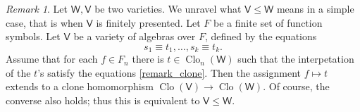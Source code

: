 \documentclass{amsart}
\theoremstyle{plain}
\theoremstyle{definition}
\theoremstyle{remark}
\newtheorem{remark}[theorem]{Remark}
\DeclareMathOperator{\Clo}{Clo}
\begin{document}
\begin{remark}
    Let $\mathsf{W}, \mathsf{V}$ be two varieties. 
    We unravel what $\mathsf{V} \le \mathsf{W}$ means in a simple case, that is when $\mathsf{V}$ is finitely presented. 
    Let $F$ be a finite set of function symbols.
    Let $\mathsf{V}$ be a variety of algebras over $F$, defined by the equations 
    \begin{equation}
        \label{remark_clone}
        s_1 \equiv t_1,\ldots, s_k \equiv t_k \text{.}
    \end{equation} 
    Assume that for each $f \in F_n$ there is $t \in \Clo_n(\mathsf{W})$ such that the interpetation of the $t$'s satisfy the equations \eqref{remark_clone}. 
    Then the assignment $f \mapsto t$ extends to a clone homomorphism $\Clo(\mathsf{V}) \to \Clo(\mathsf{W})$. 
    Of course, the converse also holds; thus this is equivalent to $\mathsf{V} \le \mathsf{W}$. 
\end{remark}
\end{document}
